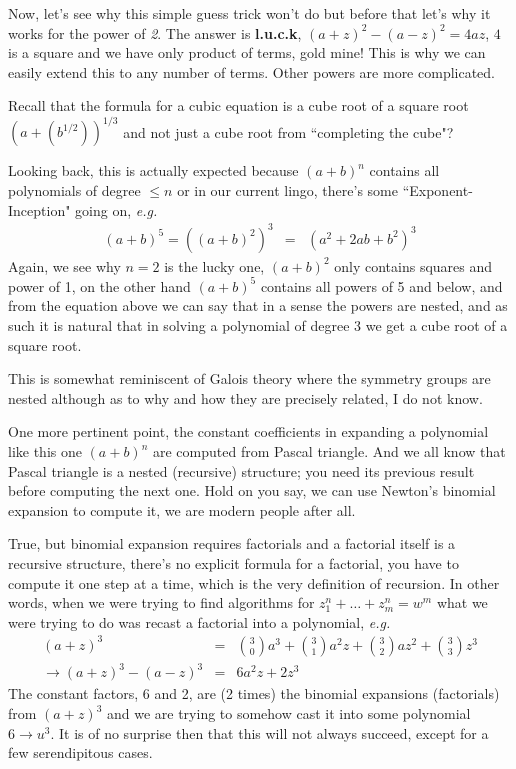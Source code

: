\documentclass[aps,preprint,preprintnumbers,nofootinbib,showpacs,prd]{revtex4-1}
\newcommand{\eg}{{\it e.g.} }
\newcommand{\nbea}{\begin{eqnarray*}}
\newcommand{\neea}{\end{eqnarray*}}
\begin{document}
Now, let's see why this simple guess trick won't do but before that let's why it works for the power of {\it 2}. The answer is {\bf l.u.c.k}, $(a+z)^2 - (a-z)^2 = 4az$, $4$ is a square and we have only product of terms, gold mine! This is why we can easily extend this to any number of terms. Other powers are more complicated.

Recall that the formula for a cubic equation is a cube root of a square root $(a + (b^{1/2}))^{1/3}$ and not just a cube root from ``completing the cube"?

Looking back, this is actually expected because $(a+b)^n$ contains all polynomials of degree $ \le n$ or in our current lingo, there's some ``Exponent-Inception" going on, \eg 
%
\nbea
(a+b)^5 = ((a+b)^2)^3 & = & (a^2 + 2ab + b^2)^3
\neea
%
Again, we see why $n=2$ is the lucky one, $(a+b)^2$ only contains squares and power of 1, on the other hand $(a+b)^5$ contains all powers of 5 and below, and from the equation above we can say that in a sense the powers are nested, and as such it is natural that in solving a polynomial of degree 3 we get a cube root of a square root.

This is somewhat reminiscent of Galois theory where the symmetry groups are nested although as to why and how they are precisely related, I do not know.

One more pertinent point, the constant coefficients in expanding a polynomial like this one $(a+b)^n$ are computed from Pascal triangle. And we all know that Pascal triangle is a nested (recursive) structure; you need its previous result before computing the next one. Hold on you say, we can use Newton's binomial expansion to compute it, we are modern people after all.

True, but binomial expansion requires factorials and a factorial itself is a recursive structure, there's no explicit formula for a factorial, you have to compute it one step at a time, which is the very definition of recursion. In other words, when we were trying to find algorithms for $z_1^n + \dots + z_m^n = w^m$ what we were trying to do was recast a factorial into a polynomial, \eg
%
\nbea
(a+z)^3 & = & {3 \choose 0} a^3 + {3 \choose 1} a^2 z + {3 \choose 2} a z^2 + {3 \choose 3} z^3 \\
\rightarrow (a+z)^3 - (a-z)^3 & = & 6 a^2 z + 2 z^3
\neea
%
The constant factors, 6 and 2, are (2 times) the binomial expansions (factorials) from $(a+z)^3$ and we are trying to somehow cast it into some polynomial $6 \rightarrow u^3$. It is of no surprise then that this will not always succeed, except for a few serendipitous cases.
\end{document}
